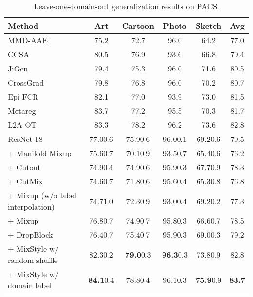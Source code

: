 \documentclass{article} \usepackage{iclr2021_conference,times}
\newcommand{\tableCellHeight}{1}
\newcommand{\tabstyle}[1]{
  \setlength{\tabcolsep}{#1}
  \renewcommand{\arraystretch}{\tableCellHeight}
  \centering
}
\begin{document}
\begin{table}[t]
\tabstyle{6pt}
\caption{Leave-one-domain-out generalization results on PACS.}
\label{tab:result_pacs}
\begin{tabular}{l | c c c c c}
\hline
Method & Art & Cartoon & Photo & Sketch & Avg \\
\hline \hline
MMD-AAE & 75.2 & 72.7 & 96.0 & 64.2 & 77.0 \\
CCSA & 80.5 & 76.9 & 93.6 & 66.8 & 79.4 \\
JiGen & 79.4 & 75.3 & 96.0 & 71.6 & 80.5 \\
CrossGrad & 79.8 & 76.8 & 96.0 & 70.2 & 80.7 \\
Epi-FCR & 82.1 & 77.0 & 93.9 & 73.0 & 81.5 \\
Metareg & 83.7 & 77.2 & 95.5 & 70.3 & 81.7 \\
L2A-OT & {83.3} & {78.2} & {96.2} & {73.6} & {82.8} \\
\hline
ResNet-18 & 77.00.6 & 75.90.6 & 96.00.1 & 69.20.6 & 79.5 \\
+ Manifold Mixup & 75.60.7 & 70.10.9 & 93.50.7 & 65.40.6 & 76.2 \\
+ Cutout & 74.90.4 & 74.90.6 & 95.90.3 & 67.70.9 & 78.3 \\
+ CutMix & 74.60.7 & 71.80.6 & 95.60.4 & 65.30.8 & 76.8 \\
+ Mixup (w/o label interpolation) & 74.71.0 & 72.30.9 & 93.00.4 & 69.20.2 & 77.3 \\
+ Mixup & 76.80.7 & 74.90.7 & 95.80.3 & 66.60.7 & 78.5 \\
+ DropBlock & 76.40.7 & 75.40.7 & 95.90.3 & 69.00.3 & 79.2 \\
+ MixStyle w/ random shuffle & {82.3}0.2 & \textbf{79.0}0.3 & \textbf{96.3}0.3 & {73.8}0.9 & {82.8} \\
+ MixStyle w/ domain label & \textbf{84.1}0.4 & 78.80.4 & 96.10.3 & \textbf{75.9}0.9 & \textbf{83.7} \\
\hline
\end{tabular}
\end{table}
\end{document}
